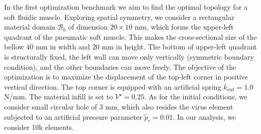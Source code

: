 In the first optimization benchmark we aim to find the optimal topology for a soft fluidic muscle. Exploring spatial symmetry, we consider a rectangular material domain $\mathcal{B}_0$ of dimension $20 \times 10$ \si{\milli \meter}, which forms the upper-left quadrant of the pneumatic soft muscle. This makes the cross-sectional size of the bellow $40$ \si{\milli \meter} in width and $20$ \si{\milli \meter} in height. The bottom of upper-left quadrant is structurally fixed, the left wall can move only vertically (symmetric boundary condition), and the other boundaries can move freely. The objective of the optimization is to maximize the displacement of the top-left corner in positive vertical direction. The top corner is equipped with an artificial spring $k_{out} = 1.0$ N/mm. The material infill is set to $V^\star = 0.25$. As for the initial conditions, we consider small circular hole of $3$ \si{\milli \meter}, which also resides the virus element subjected to an artificial pressure parameter $\tilde{p}_e = 0.01$. In our analysis, we consider 10k elements.
%

